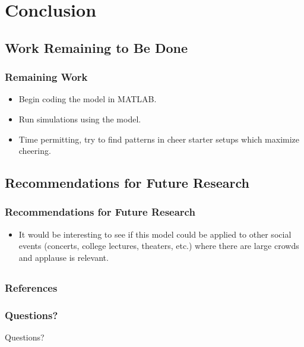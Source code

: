 \documentclass[compress,handout,10pt]{beamer}
\let\olditem\item
\renewcommand{\item}{\setlength{\itemsep}{0.5\baselineskip}\olditem}
\begin{document}
\section{Conclusion}

\subsection{Work Remaining to Be Done}

\begin{frame}
	\frametitle{Remaining Work}
	\begin {itemize}
		\item Begin coding the model in MATLAB.
		\item Run simulations using the model.
		\item Time permitting, try to find patterns in cheer starter setups which maximize cheering.
	\end {itemize}
\end{frame}

\subsection{Recommendations for Future Research}

\begin{frame}
	\frametitle {Recommendations for Future Research}
	\begin {itemize}
		\item It would be interesting to see if this model could be applied to other social events (concerts, college lectures, theaters, etc.) where there are large crowds and applause is relevant.
	\end {itemize}
\end{frame}

\subsection{}

\begin {frame} [allowframebreaks]
	\frametitle{References}
	
	
\end {frame}

\begin{frame}
	\frametitle {Questions?}
	\begin{center}
		Questions?
	\end{center}
\end{frame}
\end{document}
